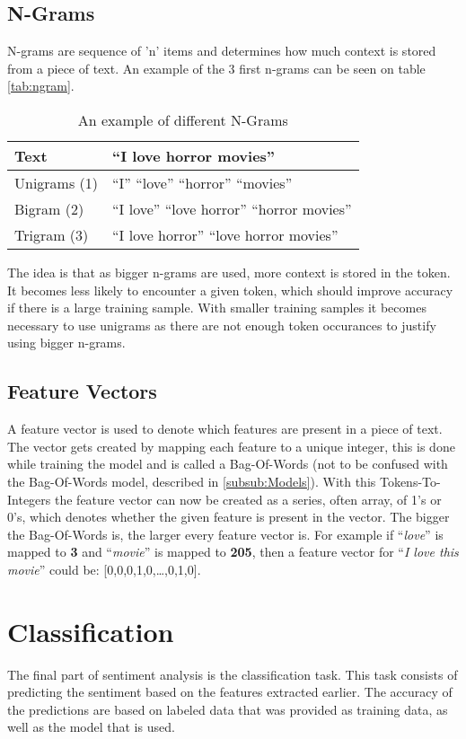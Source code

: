 \subsection{N-Grams}
N-grams are sequence of 'n' items and determines how much context is stored
from a piece of text. An example of the 3 first n-grams can be seen on table
\autoref{tab:ngram}. 

\begin{table}[H]
\centering
\begin{tabular}{|l|l|}
\hline
Text & ``I love horror movies'' \\ \hline
Unigrams (1) &
``I'' ``love'' ``horror'' ``movies''
\\ \hline 
Bigram (2) &
``I love'' ``love horror'' ``horror movies''
\\ \hline
Trigram (3) &
``I love horror'' ``love horror movies''
\\ \hline
\end{tabular}
\caption{An example of different N-Grams}
\label{tab:ngram}
\end{table}

The idea is that as bigger n-grams are used, more context is stored in the
token. It becomes less likely to encounter a given token, which should
improve accuracy if there is a large training sample. With smaller training
samples it becomes necessary to use unigrams as there are not enough
token occurances to justify using bigger n-grams.

\subsection{Feature Vectors}
A feature vector is used to denote which features are present in a piece of
text. The vector gets created by mapping each feature to a unique integer, this
is done while training the model and is called a Bag-Of-Words (not to be
confused with the Bag-Of-Words model, described in \autoref{subsub:Models}).
With this Tokens-To-Integers the feature vector can now be created as a series,
often array, of 1's or 0's, which denotes whether the given feature is present
in the vector. The bigger the Bag-Of-Words is, the larger every feature vector
is. For example if ``\textit{love}'' is mapped to \textbf{3} and
``\textit{movie}'' is mapped to \textbf{205}, then a feature vector for
``\textit{I love this movie}'' could be: [0,0,0,1,0,\ldots,0,1,0].



\section{Classification}\label{sec:Class}
The final part of sentiment analysis is the classification task. This task
consists of predicting the sentiment based on the features extracted earlier.
The accuracy of the predictions are based on labeled data that was provided as
training data, as well as the model that is used. 

